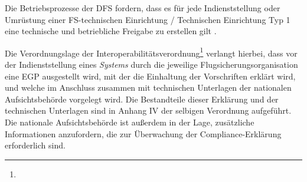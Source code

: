     \noindent
    Die Betriebsprozesse der \ac{DFS} fordern, dass es für jede Indienststellung oder Umrüstung einer FS-technischen Einrichtung / Technischen Einrichtung Typ 1 eine technische und betriebliche Freigabe zu erstellen gilt 
    \cite{fa_freigaben}.

    \medskip
    Die Verordnungslage der Interoperabilitätsverordnung\footnote{} verlangt hierbei, dass vor der Indienststellung eines \textit{Systems} durch die jeweilige Flugsicherungsorganisation eine \acf{EGP} ausgestellt wird, mit der die Einhaltung der Vorschriften erklärt wird, und welche im Anschluss zusammen mit technischen Unterlagen der nationalen Aufsichtsbehörde vorgelegt wird. 
    Die Bestandteile dieser Erklärung und der technischen Unterlagen sind in Anhang IV der selbigen Verordnung aufgeführt. 
    Die nationale Aufsichtsbehörde ist außerdem in der Lage, zusätzliche Informationen anzufordern, die zur Überwachung der Compliance-Erklärung erforderlich sind.
    \cite[Art.6 Abs.2]{2004R0552}



    






